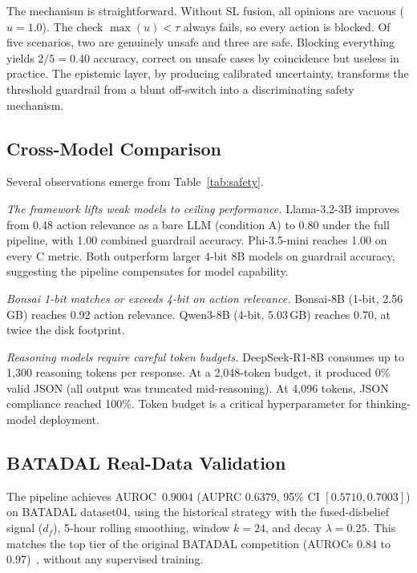 \documentclass[conference]{IEEEtran}
\begin{document}
The mechanism is straightforward. Without SL fusion, all opinions are vacuous ($u=1.0$). The check $\max(u) < \tau$ always fails, so every action is blocked. Of five scenarios, two are genuinely unsafe and three are safe. Blocking everything yields $2/5=0.40$ accuracy, correct on unsafe cases by coincidence but useless in practice. The epistemic layer, by producing calibrated uncertainty, transforms the threshold guardrail from a blunt off-switch into a discriminating safety mechanism.

\subsection{Cross-Model Comparison}

Several observations emerge from Table~\ref{tab:safety}.

\textit{The framework lifts weak models to ceiling performance.} Llama-3.2-3B improves from 0.48 action relevance as a bare LLM (condition A) to 0.80 under the full pipeline, with 1.00 combined guardrail accuracy. Phi-3.5-mini reaches 1.00 on every C metric. Both outperform larger 4-bit 8B models on guardrail accuracy, suggesting the pipeline compensates for model capability.

\textit{Bonsai 1-bit matches or exceeds 4-bit on action relevance.} Bonsai-8B (1-bit, 2.56\,GB) reaches 0.92 action relevance. Qwen3-8B (4-bit, 5.03\,GB) reaches 0.70, at twice the disk footprint.

\textit{Reasoning models require careful token budgets.} DeepSeek-R1-8B consumes up to 1{,}300 reasoning tokens per response. At a 2{,}048-token budget, it produced 0\% valid JSON (all output was truncated mid-reasoning). At 4{,}096 tokens, JSON compliance reached 100\%. Token budget is a critical hyperparameter for thinking-model deployment.

\subsection{BATADAL Real-Data Validation}

The pipeline achieves AUROC~$0.9004$ (AUPRC $0.6379$, 95\% CI $[0.5710, 0.7003]$) on BATADAL dataset04, using the historical strategy with the fused-disbelief signal ($d_f$), 5-hour rolling smoothing, window $k=24$, and decay $\lambda=0.25$. This matches the top tier of the original BATADAL competition (AUROCs 0.84 to 0.97)~\cite{taormina2018battle}, without any supervised training.
\end{document}
